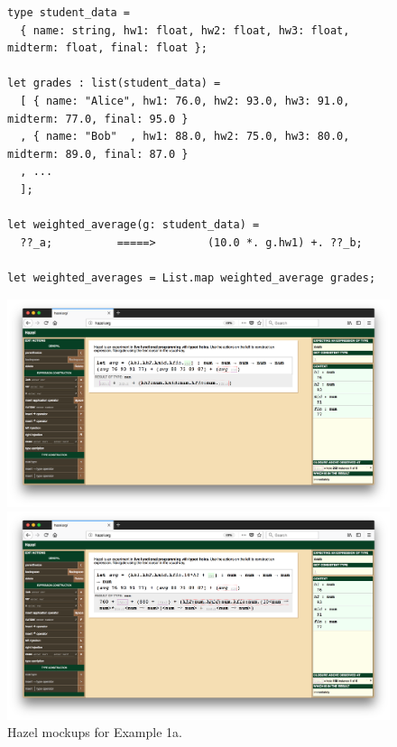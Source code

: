 \begin{figure}[t]


\lstset{basicstyle=\scriptsize\ttfamily}
\begin{lstlisting}
type student_data =
  { name: string, hw1: float, hw2: float, hw3: float, midterm: float, final: float };

let grades : list(student_data) =
  [ { name: "Alice", hw1: 76.0, hw2: 93.0, hw3: 91.0, midterm: 77.0, final: 95.0 }
  , { name: "Bob"  , hw1: 88.0, hw2: 75.0, hw3: 80.0, midterm: 89.0, final: 87.0 }
  , ...
  ];

let weighted_average(g: student_data) =
  ??_a;          =====>        (10.0 *. g.hw1) +. ??_b;

let weighted_averages = List.map weighted_average grades;
\end{lstlisting}
\lstset{basicstyle=\footnotesize\ttfamily}

\includegraphics[scale=0.20]{images/hazel-placeholder-0.png}


\includegraphics[scale=0.20]{images/hazel-placeholder-1a.png}

\caption{Hazel mockups for Example 1a.}
\label{fig:grades-example}
\end{figure}
